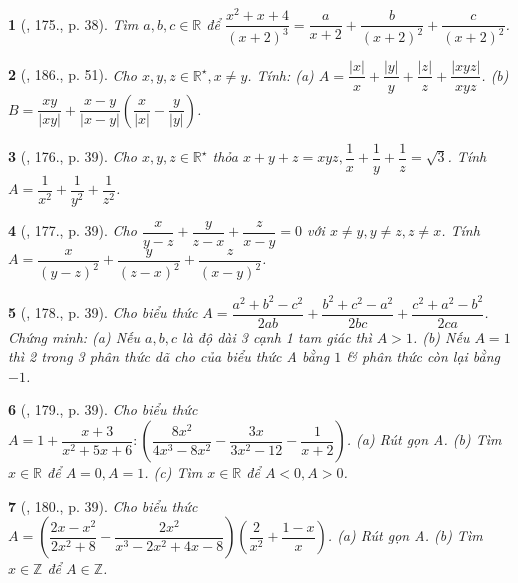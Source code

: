 \documentclass{article}
\newtheorem{baitoan}{}
\begin{document}
\begin{baitoan}[\cite{Tuyen_Toan_8}, 175., p. 38]
	Tìm $a,b,c\in\mathbb{R}$ để $\dfrac{x^2 + x + 4}{(x + 2)^3} = \dfrac{a}{x + 2} + \dfrac{b}{(x + 2)^2} + \dfrac{c}{(x + 2)^2}$.
\end{baitoan}

\begin{baitoan}[\cite{Tuyen_Toan_8_old}, 186., p. 51]
	Cho $x,y,z\in\mathbb{R}^\star,x\ne y$. Tính: (a) $A = \dfrac{|x|}{x} + \dfrac{|y|}{y} + \dfrac{|z|}{z} + \dfrac{|xyz|}{xyz}$. (b) $B = \dfrac{xy}{|xy|} + \dfrac{x - y}{|x - y|}\left(\dfrac{x}{|x|} - \dfrac{y}{|y|}\right)$.
\end{baitoan}

\begin{baitoan}[\cite{Tuyen_Toan_8}, 176., p. 39]
	Cho $x,y,z\in\mathbb{R}^\star$ thỏa $x + y + z = xyz,\dfrac{1}{x} + \dfrac{1}{y} + \dfrac{1}{z} = \sqrt{3}$. Tính $A = \dfrac{1}{x^2} + \dfrac{1}{y^2} + \dfrac{1}{z^2}$.
\end{baitoan}

\begin{baitoan}[\cite{Tuyen_Toan_8}, 177., p. 39]
	Cho $\dfrac{x}{y - z} + \dfrac{y}{z - x} + \dfrac{z}{x - y} = 0$ với $x\ne y,y\ne z,z\ne x$. Tính $A = \dfrac{x}{(y - z)^2} + \dfrac{y}{(z - x)^2} + \dfrac{z}{(x - y)^2}$.
\end{baitoan}

\begin{baitoan}[\cite{Tuyen_Toan_8}, 178., p. 39]
	Cho biểu thức $A = \dfrac{a^2 + b^2 - c^2}{2ab} + \dfrac{b^2 + c^2 - a^2}{2bc} + \dfrac{c^2 + a^2 - b^2}{2ca}$. Chứng minh: (a) Nếu $a,b,c$ là độ dài 3 cạnh 1 tam giác thì $A > 1$. (b) Nếu $A = 1$ thì 2 trong 3 phân thức dã cho của biểu thức A bằng $1$ \& phân thức còn lại bằng $-1$.
\end{baitoan}

\begin{baitoan}[\cite{Tuyen_Toan_8}, 179., p. 39]
	Cho biểu thức $A = 1 + \dfrac{x + 3}{x^2 + 5x + 6}:\left(\dfrac{8x^2}{4x^3 - 8x^2} - \dfrac{3x}{3x^2 - 12} - \dfrac{1}{x + 2}\right)$. (a) Rút gọn A. (b) Tìm $x\in\mathbb{R}$ để $A = 0,A = 1$. (c) Tìm $x\in\mathbb{R}$ để $A < 0,A > 0$.
\end{baitoan}

\begin{baitoan}[\cite{Tuyen_Toan_8}, 180., p. 39]
	Cho biểu thức $A = \left(\dfrac{2x - x^2}{2x^2 + 8} - \dfrac{2x^2}{x^3 - 2x^2 + 4x - 8}\right)\left(\dfrac{2}{x^2} + \dfrac{1 - x}{x}\right)$. (a) Rút gọn A. (b) Tìm $x\in\mathbb{Z}$ để $A\in\mathbb{Z}$.
\end{baitoan}


\printbibliography[heading=bibintoc]
	
\end{document}
